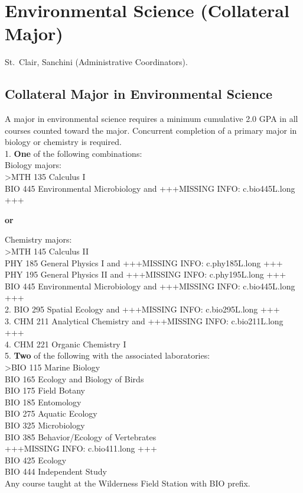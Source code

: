 \documentclass[
  letterpaper,
]{scrbook}
\begin{document}
\section{Environmental Science (Collateral
Major)}\label{sec-environmental-science}

St.~Clair, Sanchini (Administrative Coordinators).

\subsection{Collateral Major in Environmental
Science}\label{collateral-major-in-environmental-science}

A major in environmental science requires a minimum cumulative 2.0 GPA
in all courses counted toward the major. Concurrent completion of a
primary major in biology or chemistry is required.\\
1. \textbf{One} of the following combinations:\\
Biology majors:\\
\textgreater MTH 135 Calculus I\\
BIO 445 Environmental Microbiology and +++MISSING INFO: c.bio445L.long
+++

\textbf{or}

Chemistry majors:\\
\textgreater MTH 145 Calculus II\\
PHY 185 General Physics I and +++MISSING INFO: c.phy185L.long +++\\
PHY 195 General Physics II and +++MISSING INFO: c.phy195L.long +++\\
BIO 445 Environmental Microbiology and +++MISSING INFO: c.bio445L.long
+++\\
2. BIO 295 Spatial Ecology and +++MISSING INFO: c.bio295L.long +++\\
3. CHM 211 Analytical Chemistry and +++MISSING INFO: c.bio211L.long
+++\\
4. CHM 221 Organic Chemistry I\\
5. \textbf{Two} of the following with the associated laboratories:\\
\textgreater BIO 115 Marine Biology\\
BIO 165 Ecology and Biology of Birds\\
BIO 175 Field Botany\\
BIO 185 Entomology\\
BIO 275 Aquatic Ecology\\
BIO 325 Microbiology\\
BIO 385 Behavior/Ecology of Vertebrates\\
+++MISSING INFO: c.bio411.long +++\\
BIO 425 Ecology\\
BIO 444 Independent Study\\
Any course taught at the Wilderness Field Station with BIO prefix.
\end{document}
